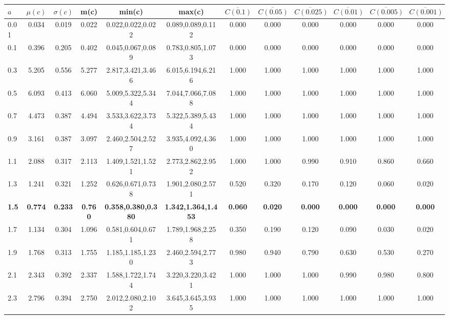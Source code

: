 \begin{table*}[h!]
\begin{center}
\begin{tabular}{| l | c | c | c | c | c | c | c | c | c | c | c |}\hline
$a$ & $\mu(c)$ & $\sigma(c)$ & m(c) & min(c) & max(c) & $\overline{C(0.1)}$ & $\overline{C(0.05)}$ & $\overline{C(0.025)}$ & $\overline{C(0.01)}$ & $\overline{C(0.005)}$ & $\overline{C(0.001)}$ \\\hline\hline
0.01 & 0.034 & 0.019 & 0.022 & 0.022,0.022,0.022 & 0.089,0.089,0.112  & 0.000  & 0.000  & 0.000  & 0.000  & 0.000  & 0.000 \\\hline
0.1 & 0.396 & 0.205 & 0.402 & 0.045,0.067,0.089 & 0.783,0.805,1.073  & 0.000  & 0.000  & 0.000  & 0.000  & 0.000  & 0.000 \\\hline
0.3 & 5.205 & 0.556 & 5.277 & 2.817,3.421,3.466 & 6.015,6.194,6.216  & 1.000  & 1.000  & 1.000  & 1.000  & 1.000  & 1.000 \\\hline
0.5 & 6.093 & 0.413 & 6.060 & 5.009,5.322,5.344 & 7.044,7.066,7.088  & 1.000  & 1.000  & 1.000  & 1.000  & 1.000  & 1.000 \\\hline
0.7 & 4.473 & 0.387 & 4.494 & 3.533,3.622,3.734 & 5.322,5.389,5.434  & 1.000  & 1.000  & 1.000  & 1.000  & 1.000  & 1.000 \\\hline
0.9 & 3.161 & 0.387 & 3.097 & 2.460,2.504,2.527 & 3.935,4.092,4.360  & 1.000  & 1.000  & 1.000  & 1.000  & 1.000  & 1.000 \\\hline
1.1 & 2.088 & 0.317 & 2.113 & 1.409,1.521,1.521 & 2.773,2.862,2.952  & 1.000  & 1.000  & 0.990  & 0.910  & 0.860  & 0.660 \\\hline
1.3 & 1.241 & 0.321 & 1.252 & 0.626,0.671,0.738 & 1.901,2.080,2.571  & 0.520  & 0.320  & 0.170  & 0.120  & 0.060  & 0.020 \\\hline
{\bf 1.5} & {\bf 0.774} & {\bf 0.233} & {\bf 0.760} & {\bf 0.358,0.380,0.380} & {\bf 1.342,1.364,1.453} & {\bf 0.060} & {\bf 0.020} & {\bf 0.000} & {\bf 0.000} & {\bf 0.000} & {\bf 0.000} \\\hline
1.7 & 1.134 & 0.304 & 1.096 & 0.581,0.604,0.671 & 1.789,1.968,2.258  & 0.350  & 0.190  & 0.120  & 0.090  & 0.030  & 0.020 \\\hline
1.9 & 1.768 & 0.313 & 1.755 & 1.185,1.185,1.230 & 2.460,2.594,2.773  & 0.980  & 0.940  & 0.790  & 0.630  & 0.530  & 0.270 \\\hline
2.1 & 2.343 & 0.392 & 2.337 & 1.588,1.722,1.744 & 3.220,3.220,3.421  & 1.000  & 1.000  & 1.000  & 0.990  & 0.980  & 0.800 \\\hline
2.3 & 2.796 & 0.394 & 2.750 & 2.012,2.080,2.102 & 3.645,3.645,3.935  & 1.000  & 1.000  & 1.000  & 1.000  & 1.000  & 1.000 \\\hline

\end{tabular}
\end{center}
\end{table*}
